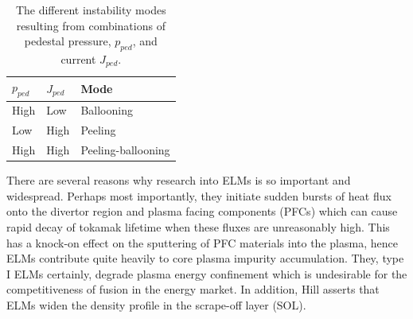 \documentclass[11pt, twocolumn]{article}  %
\begin{document}
\begin{table}[h]
\centering
\caption{The different instability modes resulting from combinations of pedestal pressure, $p_{ped}$, and current $J_{ped}$.\cite{Lang2013}}
\label{tab:PB}
\begin{tabular}{ l | l | l}
\hline
\textbf{$p_{ped}$}   & \textbf{$J_{ped}$} & \textbf{Mode} \\ \hline
   High      &    Low     &  Ballooning \\ 
   Low       &    High    &  Peeling    \\
   High      &    High    &  Peeling-ballooning
\end{tabular}
\end{table}

There are several reasons why research into ELMs is so important and widespread. Perhaps most importantly, they initiate sudden bursts of heat flux onto the divertor region and plasma facing components (PFCs) which can cause rapid decay of tokamak lifetime when these fluxes are unreasonably high. This has a knock-on effect on the sputtering of PFC materials into the plasma, hence ELMs contribute quite heavily to core plasma impurity accumulation. They, type I ELMs certainly, degrade plasma energy confinement which is undesirable for the competitiveness of fusion in the energy market. In addition, Hill \cite{Hill1997} asserts that ELMs widen the density profile in the scrape-off layer (SOL).
\end{document}
